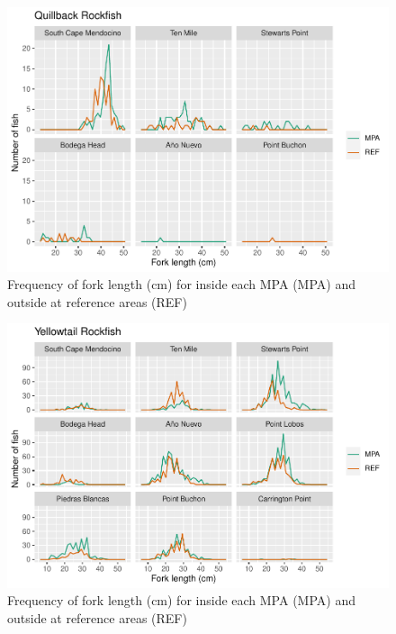 \documentclass[
]{article}
\begin{document}
\begin{figure}
\centering
\includegraphics{CCRFP_available_data_for_assessments_files/figure-latex/unnamed-chunk-4-3.pdf}
\caption{\label{fig:unnamed-chunk-4-3}Frequency of fork length (cm) for inside each MPA (MPA) and outside at reference areas (REF)}
\end{figure}

\begin{figure}
\centering
\includegraphics{CCRFP_available_data_for_assessments_files/figure-latex/unnamed-chunk-4-4.pdf}
\caption{\label{fig:unnamed-chunk-4-4}Frequency of fork length (cm) for inside each MPA (MPA) and outside at reference areas (REF)}
\end{figure}

\clearpage
\newpage
\end{document}
